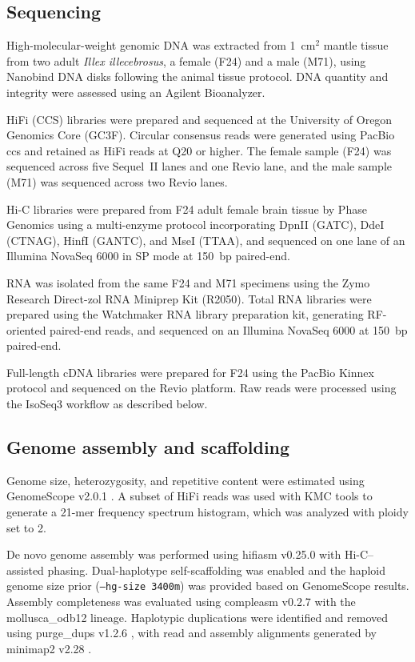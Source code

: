 \documentclass[12pt]{article}
\newcommand{\citep}{\parencite}
\newcommand{\illex}{\textit{Illex illecebrosus}\xspace}
\begin{document}
\subsection*{Sequencing}

High-molecular-weight genomic DNA was extracted from 1~cm$^2$ mantle tissue
from two adult \illex, a female (F24) and a male (M71),
using Nanobind DNA disks following the animal tissue protocol.
DNA quantity and integrity were assessed using an Agilent Bioanalyzer.

HiFi (CCS) libraries were prepared and sequenced at the University of Oregon Genomics Core (GC3F).
Circular consensus reads were generated using PacBio ccs
and retained as HiFi reads at Q20 or higher.
The female sample (F24) was sequenced across five Sequel~II lanes and one Revio lane,
and the male sample (M71) was sequenced across two Revio lanes.

Hi-C libraries were prepared from F24 adult female brain tissue
by Phase Genomics using a multi-enzyme protocol
incorporating DpnII (GATC), DdeI (CTNAG), HinfI (GANTC), and MseI (TTAA),
and sequenced on one lane of an Illumina NovaSeq 6000 in SP mode at 150~bp paired-end.

RNA was isolated from the same F24 and M71 specimens
using the Zymo Research Direct-zol RNA Miniprep Kit (R2050).
Total RNA libraries were prepared using the Watchmaker RNA library preparation kit,
generating RF-oriented paired-end reads,
and sequenced on an Illumina NovaSeq 6000 at 150~bp paired-end.

Full-length cDNA libraries were prepared for F24
using the PacBio Kinnex protocol and sequenced on the Revio platform.
Raw reads were processed using the IsoSeq3 workflow as described below.

\subsection*{Genome assembly and scaffolding}

Genome size, heterozygosity, and repetitive content were estimated
using GenomeScope v2.0.1 \citep{Vurture2017}.
A subset of HiFi reads was used with KMC tools \citep{Kokot2017}
to generate a 21-mer frequency spectrum histogram,
which was analyzed with ploidy set to 2.

De novo genome assembly was performed using hifiasm v0.25.0 \citep{Cheng2021}
with Hi-C--assisted phasing.
Dual-haplotype self-scaffolding was enabled
and the haploid genome size prior (\texttt{--hg-size 3400m})
was provided based on GenomeScope results.
Assembly completeness was evaluated using compleasm v0.2.7 \citep{Huang2023Compleasm}
with the mollusca\_odb12 lineage.
Haplotypic duplications were identified and removed
using purge\_dups v1.2.6 \citep{Guan2020},
with read and assembly alignments generated by minimap2 v2.28 \citep{Li2018}.
\end{document}
